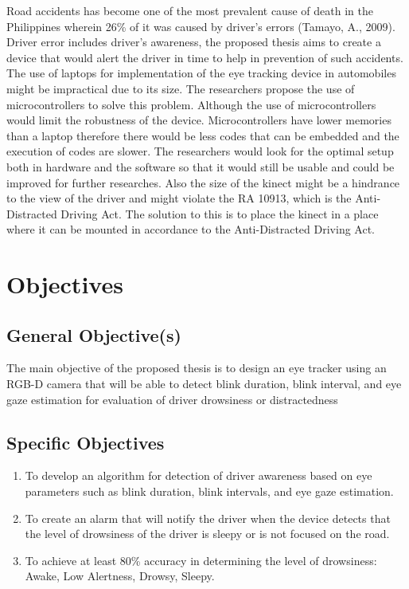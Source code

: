 Road accidents has become one of the most prevalent cause of death in the Philippines wherein 26\% of it was caused by driver’s errors (Tamayo, A., 2009). Driver error includes driver’s awareness, the proposed thesis aims to create a device that would alert the driver in time to help in prevention of such accidents.
The use of laptops for implementation of the eye tracking device in automobiles might be impractical due to its size. The researchers propose the use of microcontrollers to solve this problem. Although the use of microcontrollers would limit the robustness of the device. Microcontrollers have lower memories than a laptop therefore there would be less codes that can be embedded and the execution of codes are slower. The researchers would look for the optimal setup both in hardware and the software so that it would still be usable and could be improved for further researches.
Also the size of the kinect might be a hindrance to the view of the driver and might violate the RA 10913, which is the Anti-Distracted Driving Act. The solution to this is to place the kinect in a place where it can be mounted in accordance to the Anti-Distracted Driving Act.



\section{Objectives}


\subsection{General Objective(s)}
The main objective of the proposed thesis is to design an eye tracker using an RGB-D camera that will be able to detect blink duration, blink interval, and eye gaze estimation for evaluation of driver drowsiness or distractedness

\subsection{Specific Objectives}

\begin{enumerate}
	
	\item To develop an algorithm for detection of driver awareness based on eye parameters such as blink duration, blink intervals, and eye gaze estimation.
	
	\item To create an alarm that will notify the driver when the device detects that the level of drowsiness of the driver is sleepy or is not focused on the road.
	
	\item To achieve at least 80\% accuracy in determining the level of drowsiness: Awake, Low Alertness, Drowsy, Sleepy.
	
\end{enumerate}



